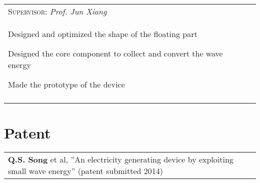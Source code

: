 \documentclass[a4paper,10pt]{article}
\begin{document}
\begin{tabular}{p{14cm}r}
\hspace{1em}  \textsc{Supervisor:} \emph{Prof. Jun Xiang}  & \vspace{-0.5em}\\
\begin{compactitem}
       \item Designed and optimized the shape of the floating part
       \item Designed the core component to collect and convert the wave energy
       \item Made the prototype of the device
     \end{compactitem}&\vspace{-1em} \\
\multicolumn{2}{c}{} \vspace{-1.5em} \\


\end{tabular}

\section{Patent}
\begin{tabular}{ll}
\textbf{Q.S. Song} et al, ”An electricity generating device by exploiting small wave energy” (patent submitted 2014) &\\
\end{tabular}
\end{document}
